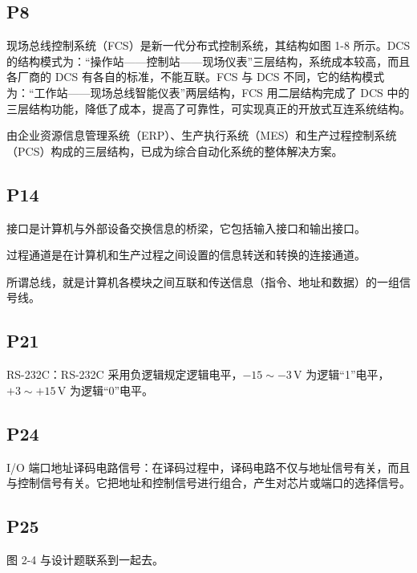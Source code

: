 \documentclass[zihao=-4
]{ctexart}%
\begin{document}
\hypertarget{header-n78}{%
\subsection{P8}\label{header-n78}}

现场总线控制系统（FCS）是新一代分布式控制系统，其结构如图 1-8 所示。DCS
的结构模式为：“操作站——控制站——现场仪表”三层结构，系统成本较高，而且各厂商的
DCS 有各自的标准，不能互联。FCS 与 DCS
不同，它的结构模式为：“工作站——现场总线智能仪表”两层结构，FCS
用二层结构完成了 DCS
中的三层结构功能，降低了成本，提高了可靠性，可实现真正的开放式互连系统结构。

由企业资源信息管理系统（ERP）、生产执行系统（MES）和生产过程控制系统（PCS）构成的三层结构，已成为综合自动化系统的整体解决方案。

\hypertarget{header-n81}{%
\subsection{P14}\label{header-n81}}

接口是计算机与外部设备交换信息的桥梁，它包括输入接口和输出接口。

过程通道是在计算机和生产过程之间设置的信息转送和转换的连接通道。

所谓总线，就是计算机各模块之间互联和传送信息（指令、地址和数据）的一组信号线。

\hypertarget{header-n85}{%
\subsection{P21}\label{header-n85}}

RS-232C：RS-232C 采用负逻辑规定逻辑电平，\(-15\sim-3\,\mathrm{V}\)
为逻辑“1”电平，\(+3\sim+15\,\mathrm{V}\) 为逻辑“0”电平。

\hypertarget{header-n87}{%
\subsection{P24}\label{header-n87}}

I/O
端口地址译码电路信号：在译码过程中，译码电路不仅与地址信号有关，而且与控制信号有关。它把地址和控制信号进行组合，产生对芯片或端口的选择信号。

\hypertarget{header-n89}{%
\subsection{P25}\label{header-n89}}

图 2-4 与设计题联系到一起去。
\end{document}
